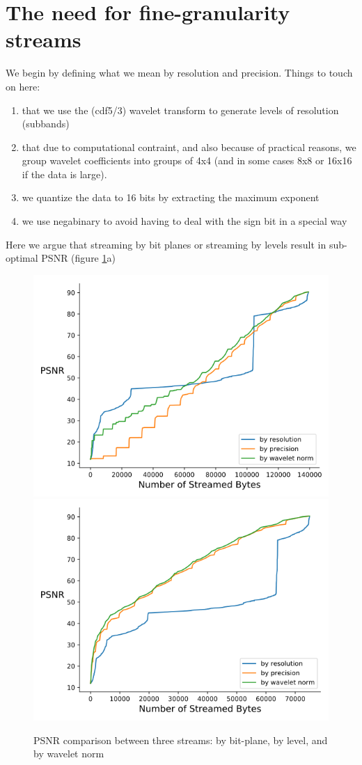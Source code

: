 \section{The need for fine-granularity streams}
We begin by defining what we mean by resolution and precision. Things to touch on here:
\begin{enumerate}
  \item that we use the (cdf5/3) wavelet transform to generate levels of resolution (subbands)
  \item that due to computational contraint, and also because of practical reasons, we group wavelet coefficients into groups of 4x4 (and in some cases 8x8 or 16x16 if the data is large).
  \item we quantize the data to 16 bits by extracting the maximum exponent
  \item we use negabinary to avoid having to deal with the sign bit in a special way
\end{enumerate}

Here we argue that streaming by bit planes or streaming by levels result in sub-optimal PSNR (figure \ref{fig:psnr_traditional_vs_by_norm_viscosity}a)

\begin{figure}[t]
	\centering
	{\includegraphics[width=0.4\linewidth]{resources/rmse-miranda-viscosity.png}}
	{\includegraphics[width=0.4\linewidth]{resources/rmse-miranda-viscosity_slz.png}}
	\caption {PSNR comparison between three streams: by bit-plane, by level, and by wavelet norm}
	\label{fig:psnr_traditional_vs_by_norm_viscosity}
\end{figure}

